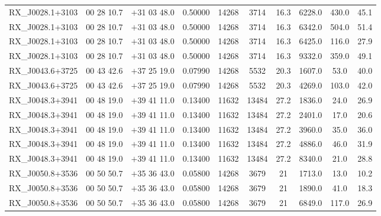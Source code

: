 \begin{landscape}
\begin{center}
\begin{longtable}{l c c c c c c c c c}
RX\_J0028.1+3103  &        00 28 10.7  &         $+$31 03 48.0  &       0.50000  & 14268  &   3714  &       16.3  &      6228.0  &  430.0  &  45.1  \\
RX\_J0028.1+3103  &        00 28 10.7  &         $+$31 03 48.0  &       0.50000  & 14268  &   3714  &       16.3  &      6342.0  &  504.0  &  51.4  \\
RX\_J0028.1+3103  &        00 28 10.7  &         $+$31 03 48.0  &       0.50000  & 14268  &   3714  &       16.3  &      6425.0  &  116.0  &  27.9  \\
RX\_J0028.1+3103  &        00 28 10.7  &         $+$31 03 48.0  &       0.50000  & 14268  &   3714  &       16.3  &      9332.0  &  359.0  &  49.1  \\
RX\_J0043.6+3725  &        00 43 42.6  &         $+$37 25 19.0  &       0.07990  & 14268  &   5532  &       20.3  &      1607.0  &  53.0  &   40.0  \\
RX\_J0043.6+3725  &        00 43 42.6  &         $+$37 25 19.0  &       0.07990  & 14268  &   5532  &       20.3  &      4269.0  &  103.0  &  42.0  \\
RX\_J0048.3+3941  &        00 48 19.0  &         $+$39 41 11.0  &       0.13400  & 11632  &   13484  &      27.2  &      1836.0  &  24.0  &   26.9  \\
RX\_J0048.3+3941  &        00 48 19.0  &         $+$39 41 11.0  &       0.13400  & 11632  &   13484  &      27.2  &      2401.0  &  17.0  &   20.6  \\
RX\_J0048.3+3941  &        00 48 19.0  &         $+$39 41 11.0  &       0.13400  & 11632  &   13484  &      27.2  &      3960.0  &  35.0  &   36.0  \\
RX\_J0048.3+3941  &        00 48 19.0  &         $+$39 41 11.0  &       0.13400  & 11632  &   13484  &      27.2  &      4886.0  &  46.0  &   31.9  \\
RX\_J0048.3+3941  &        00 48 19.0  &         $+$39 41 11.0  &       0.13400  & 11632  &   13484  &      27.2  &      8340.0  &  21.0  &   28.8  \\
RX\_J0050.8+3536  &        00 50 50.7  &         $+$35 36 43.0  &       0.05800  & 14268  &   3679  &       21  &        1713.0  &  13.0  &   10.2  \\
RX\_J0050.8+3536  &        00 50 50.7  &         $+$35 36 43.0  &       0.05800  & 14268  &   3679  &       21  &        1890.0  &  41.0  &   18.3  \\
RX\_J0050.8+3536  &        00 50 50.7  &         $+$35 36 43.0  &       0.05800  & 14268  &   3679  &       21  &        6849.0  &  117.0  &  26.9  \\

\end{longtable}
\end{center}
\end{landscape}
